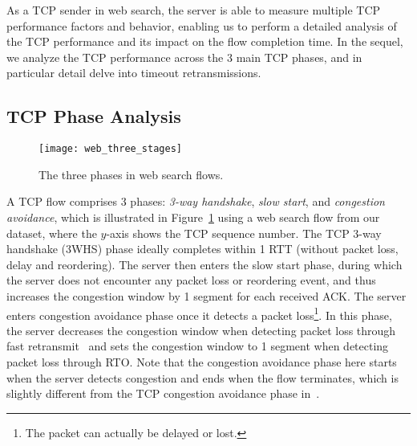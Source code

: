 %

As a TCP sender in web search, the server is able to measure multiple TCP performance factors and behavior, enabling us to perform a detailed analysis of the TCP performance and its impact on the flow completion time. In the sequel, we analyze the TCP performance across the 3 main TCP phases, and in particular detail delve into timeout retransmissions.

\subsection{TCP Phase Analysis}

\begin{figure}[th]
\centering
\texttt{[image: web\_three\_stages]}
\caption{The three phases in web search flows.}
\label{fig:web_three_stages}
\end{figure}

A TCP flow comprises 3 phases: \emph{3-way handshake}, \emph{slow start}, and \emph{congestion avoidance}, which is illustrated in Figure~\ref{fig:web_three_stages} using a web search flow from our dataset, where the $y$-axis shows the TCP sequence number. The TCP 3-way handshake (3WHS) phase ideally completes within 1 RTT (\ie without packet loss, delay and reordering). The server then enters the slow start phase, during which the server does not encounter any packet loss or reordering event, and thus increases the congestion window by 1 segment for each received ACK. The server enters congestion avoidance phase once it detects a packet loss\footnote{The packet can actually be delayed or lost.}. In this phase, the server decreases the congestion window when detecting packet loss through fast retransmit~\cite{rfc6675} and sets the congestion window to 1 segment when detecting packet loss through RTO. Note that the congestion avoidance phase here starts when the server detects congestion and ends when the flow terminates, which is slightly different from the TCP congestion avoidance phase in~\cite{jacobson1988congestion}.

